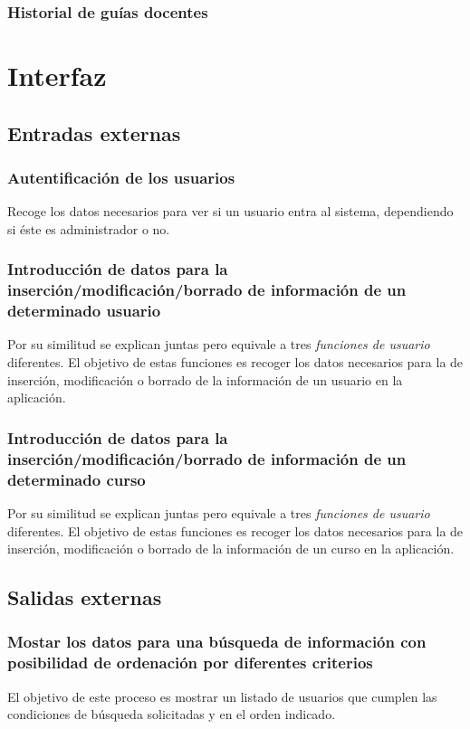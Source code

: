 \documentclass[11pt,a4paper,spanish,twoside]{book}
\begin{document}
\subsubsection{Historial de guías docentes}

\section{Interfaz}
\subsection{Entradas externas}
\subsubsection{Autentificación de los usuarios}
Recoge los datos necesarios para ver si un usuario entra al sistema,
dependiendo si éste es administrador o no.

\subsubsection{Introducción de datos para la inserción/modificación/borrado 
de información de un determinado usuario}
Por su similitud se explican juntas pero equivale a tres \emph{funciones de
usuario} diferentes. El objetivo de estas funciones es recoger los datos
necesarios para la de inserción, modificación o borrado de la información de
un usuario en la aplicación.

\subsubsection{Introducción de datos para la inserción/modificación/borrado 
de información de un determinado curso }
Por su similitud se explican juntas pero equivale a tres \emph{funciones de
usuario} diferentes. El objetivo de estas funciones es recoger los datos
necesarios para la de inserción, modificación o borrado de la información de
un curso en la aplicación.

\subsection{Salidas externas}
\subsubsection{Mostar los datos para una búsqueda de información con
posibilidad de ordenación por diferentes criterios}
El objetivo de este proceso es mostrar un listado de usuarios que cumplen las
condiciones de búsqueda solicitadas y en el orden indicado.
\end{document}
